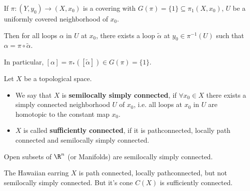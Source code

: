 \begin{rem}[]
  If $\pi:(Y,y_0) \to  (X,x_0)$ is a covering with $G(\pi) = \{1\} \subseteq \pi_1(X,x_0)$, $U$ be a uniformly covered neighborhood of $x_0$.

  Then for all loops $\alpha$ in $U$ at $x_0$, there exists a loop $\tilde{\alpha}$ at $y_0 \in \pi^{-1}(U)$ such that $\alpha = \pi \circ \tilde{\alpha}$.

  In particular, $[\alpha] = \pi_{\ast}([\tilde{\alpha}]) \in G(\pi) = \{1\}$.
\end{rem}


\begin{dfn}[]
Let $X$ be a topological space.
\begin{itemize}
  \item We say that $X$ is \textbf{semilocally simply connected}, if $\forall x_0 \in X$ there exists a simply connected neighborhood $U$ of $x_0$, i.e. all loops at $x_0$ in $U$ are homotopic to the constant map $x_0$.
  \item $X$ is called \textbf{sufficiently connected}, if it is pathconnected, locally path connected and semilocally simply connected.
\end{itemize}
\end{dfn}

\begin{ex}[]
  Open subsets of $\R^{n}$ (or Manifolds) are semilocally simply connected.

  The Hawaiian earring $X$ is path connected, locally pathconnected, but not semilocally simply connected.
  But it's cone $C(X)$ is sufficiently connected.
\end{ex}

